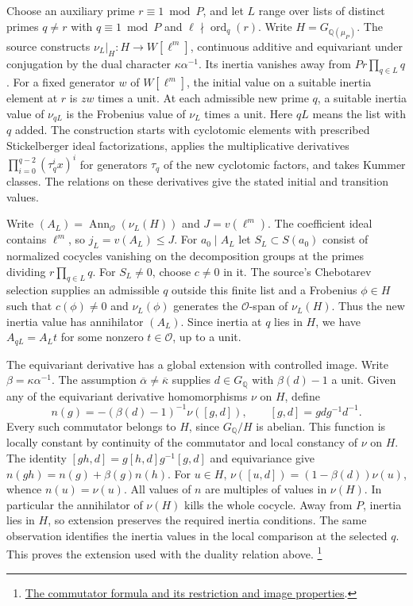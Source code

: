 Choose an auxiliary prime \(r\equiv1\bmod P\), and let \(L\) range
over lists of distinct primes \(q\ne r\) with \(q\equiv1\bmod P\)
and \(\ell\nmid\operatorname{ord}_{q}(r)\).
Write \(H=G_{\mathbb Q(\mu_P)}\). The source constructs
\(\nu_L|_H:H\to W[\ell^m]\), continuous additive and equivariant
under conjugation by the dual character \(\kappa\alpha^{-1}\).
Its inertia vanishes away from \(Pr\prod_{q\in L}q\).
For a fixed generator \(w\) of \(W[\ell^m]\), the initial value on a
suitable inertia element at \(r\) is \(zw\) times a unit. At each
admissible new prime \(q\), a suitable inertia value of \(\nu_{qL}\)
is the Frobenius value of \(\nu_L\) times a unit. Here \(qL\) means
the list with \(q\) added. The construction starts with cyclotomic
elements with prescribed Stickelberger ideal factorizations, applies
the multiplicative derivatives
\(\prod_{i=0}^{q-2}(\tau_q^i x)^i\) for generators \(\tau_q\) of the
new cyclotomic factors, and takes Kummer classes. The relations on
these derivatives give the stated initial and transition values.

Write \((A_L)=\operatorname{Ann}_{\mathcal O}(\nu_L(H))\) and
\(J=v(\ell^m)\). The coefficient ideal contains \(\ell^m\), so
\(j_L=v(A_L)\le J\). For \(a_0\mid A_L\) let \(S_L\subset S(a_0)\)
consist of normalized cocycles vanishing on the decomposition groups
at the primes dividing \(r\prod_{q\in L}q\). For \(S_L\ne0\),
choose \(c\ne0\) in it. The source's Chebotarev selection supplies
an admissible \(q\) outside this finite list and a Frobenius
\(\phi\in H\) such that \(c(\phi)\ne0\) and \(\nu_L(\phi)\)
generates the \(\mathcal O\)-span of \(\nu_L(H)\). Thus
the new inertia value has annihilator \((A_L)\).
Since inertia at \(q\) lies in \(H\), we have
\(A_{qL}=A_L t\) for some nonzero \(t\in\mathcal O\), up to a unit.

The equivariant derivative has a global extension with controlled
image. Write \(\beta=\kappa\alpha^{-1}\). The assumption
\(\overline\alpha\ne\overline\kappa\) supplies \(d\in G_{\mathbb Q}\)
with \(\beta(d)-1\) a unit. Given any of the equivariant derivative
homomorphisms \(\nu\) on \(H\), define
\[
 n(g)=-(\beta(d)-1)^{-1}\nu([g,d]),\qquad
 [g,d]=gdg^{-1}d^{-1}.
\]
Every such commutator belongs to \(H\), since \(G_{\mathbb Q}/H\)
is abelian. This function is locally constant by continuity of the
commutator and local constancy of \(\nu\) on \(H\). The identity
\([gh,d]=g[h,d]g^{-1}[g,d]\) and equivariance give
\(n(gh)=n(g)+\beta(g)n(h)\). For \(u\in H\),
\(\nu([u,d])=(1-\beta(d))\nu(u)\), whence \(n(u)=\nu(u)\).
All values of \(n\) are multiples of values in \(\nu(H)\).
In particular the annihilator of \(\nu(H)\) kills the whole cocycle.
Away from \(P\), inertia lies in \(H\), so extension preserves the
required inertia conditions. The same observation identifies the
inertia values in the local comparison at the selected \(q\). This
proves the extension used with the duality relation above.
\footnote{\href{https://github.com/Deicyde/riemann-hypothesis/blob/40e56bab026552e089d7afcfeff08d2defb9c005/src/Development/AutomorphicArithmetic/AutomorphicVarieties/PrimitiveFrobeniusFixed/ImportsAlt.lean}{The commutator formula and its restriction and image properties}.}

